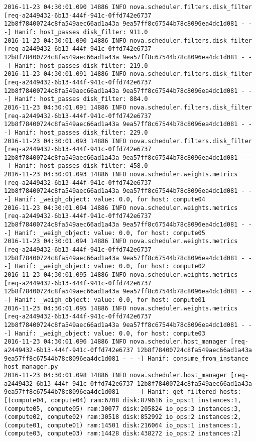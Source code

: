 \begin{lstlisting}[frame=single, caption={The filter scheduler log trace for 10 virtual instances}, label={lst:filterschedulercodetracelog10vi}, escapechar=|]
2016-11-23 04:30:01.090 14886 INFO nova.scheduler.filters.disk_filter [req-a2449432-6b13-444f-941c-0ffd742e6737 12b8f78400724c8fa549aec66ad1a43a 9ea57ff8c67544b78c8096ea4dc1d081 - - -] Hanif: host_passes disk_filter: 911.0
2016-11-23 04:30:01.090 14886 INFO nova.scheduler.filters.disk_filter [req-a2449432-6b13-444f-941c-0ffd742e6737 12b8f78400724c8fa549aec66ad1a43a 9ea57ff8c67544b78c8096ea4dc1d081 - - -] Hanif: host_passes disk_filter: 219.0
2016-11-23 04:30:01.091 14886 INFO nova.scheduler.filters.disk_filter [req-a2449432-6b13-444f-941c-0ffd742e6737 12b8f78400724c8fa549aec66ad1a43a 9ea57ff8c67544b78c8096ea4dc1d081 - - -] Hanif: host_passes disk_filter: 884.0
2016-11-23 04:30:01.091 14886 INFO nova.scheduler.filters.disk_filter [req-a2449432-6b13-444f-941c-0ffd742e6737 12b8f78400724c8fa549aec66ad1a43a 9ea57ff8c67544b78c8096ea4dc1d081 - - -] Hanif: host_passes disk_filter: 229.0
2016-11-23 04:30:01.093 14886 INFO nova.scheduler.filters.disk_filter [req-a2449432-6b13-444f-941c-0ffd742e6737 12b8f78400724c8fa549aec66ad1a43a 9ea57ff8c67544b78c8096ea4dc1d081 - - -] Hanif: host_passes disk_filter: 458.0
2016-11-23 04:30:01.093 14886 INFO nova.scheduler.weights.metrics [req-a2449432-6b13-444f-941c-0ffd742e6737 12b8f78400724c8fa549aec66ad1a43a 9ea57ff8c67544b78c8096ea4dc1d081 - - -] Hanif: _weigh_object: value: 0.0, for host: compute04
2016-11-23 04:30:01.094 14886 INFO nova.scheduler.weights.metrics [req-a2449432-6b13-444f-941c-0ffd742e6737 12b8f78400724c8fa549aec66ad1a43a 9ea57ff8c67544b78c8096ea4dc1d081 - - -] Hanif: _weigh_object: value: 0.0, for host: compute05
2016-11-23 04:30:01.094 14886 INFO nova.scheduler.weights.metrics [req-a2449432-6b13-444f-941c-0ffd742e6737 12b8f78400724c8fa549aec66ad1a43a 9ea57ff8c67544b78c8096ea4dc1d081 - - -] Hanif: _weigh_object: value: 0.0, for host: compute02
2016-11-23 04:30:01.095 14886 INFO nova.scheduler.weights.metrics [req-a2449432-6b13-444f-941c-0ffd742e6737 12b8f78400724c8fa549aec66ad1a43a 9ea57ff8c67544b78c8096ea4dc1d081 - - -] Hanif: _weigh_object: value: 0.0, for host: compute01
2016-11-23 04:30:01.095 14886 INFO nova.scheduler.weights.metrics [req-a2449432-6b13-444f-941c-0ffd742e6737 12b8f78400724c8fa549aec66ad1a43a 9ea57ff8c67544b78c8096ea4dc1d081 - - -] Hanif: _weigh_object: value: 0.0, for host: compute03
2016-11-23 04:30:01.096 14886 INFO nova.scheduler.host_manager [req-a2449432-6b13-444f-941c-0ffd742e6737 12b8f78400724c8fa549aec66ad1a43a 9ea57ff8c67544b78c8096ea4dc1d081 - - -] Hanif: consume_from_instance host_manager.py
2016-11-23 04:30:01.098 14886 INFO nova.scheduler.host_manager [req-a2449432-6b13-444f-941c-0ffd742e6737 12b8f78400724c8fa549aec66ad1a43a 9ea57ff8c67544b78c8096ea4dc1d081 - - -] Hanif: get_filtered_hosts: [(compute04, compute04) ram:6708 disk:879616 io_ops:1 instances:1, (compute05, compute05) ram:30077 disk:205824 io_ops:3 instances:3, (compute02, compute02) ram:30518 disk:852992 io_ops:2 instances:2, (compute01, compute01) ram:14501 disk:216064 io_ops:1 instances:1, (compute03, compute03) ram:14428 disk:438272 io_ops:2 instances:2]

\end{lstlisting}
